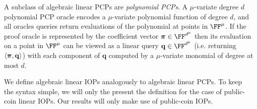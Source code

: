 A subclass of algebraic linear PCPs are \emph{polynomial PCPs}. A $\mu$-variate degree $d$ polynomial PCP oracle encodes a $\mu$-variate polynomial function of degree $d$, and all oracles queries return evaluations of the polynomial at points in $\FF^\mu$. If the proof oracle is represented by the coefficient vector $\proofO \in \FF^{d^\mu}$ then its evaluation on a point in $\FF^\mu$ can be viewed as a linear query $\mathbf{q} \in \FF^{d^\mu}$ (i.e. returning $\langle \boldsymbol{\pi}, \mathbf{q} \rangle$) with each component of $\mathbf{q}$ computed by a $\mu$-variate monomial of degree at most $d$. 

We define algebraic linear IOPs analogously to algebraic linear PCPs. To keep the syntax simple, we will only the present the definition for the case of public-coin linear IOPs. Our results will only make use of public-coin IOPs. 

